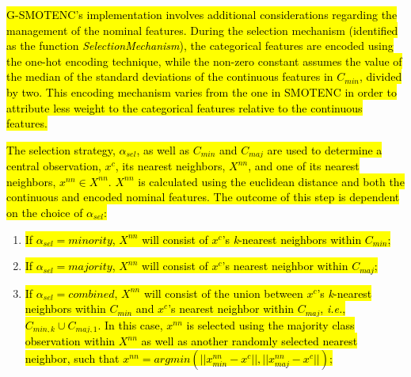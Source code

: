\documentclass[preprint,12pt]{elsarticle}
\begin{document}
{\begin{algorithm}

\end{algorithm}

\hl{G-SMOTENC's implementation involves additional considerations regarding the
management of the nominal features. During the selection mechanism (identified
as the function \textit{SelectionMechanism}), the categorical features are
encoded using the one-hot encoding technique, while the non-zero constant
assumes the value of the median of the standard deviations of the continuous
features in $C_{min}$, divided by two. This encoding mechanism varies from
the one in SMOTENC in order to attribute less weight to the categorical
features relative to the continuous features.}

\hl{The selection strategy, $\alpha_{sel}$,
as well as $C_{min}$ and $C_{maj}$ are used to determine a central
observation, $x^c$, its nearest neighbors, $X^{nn}$, and one of its nearest
neighbors, $x^{nn} \in X^{nn}$. $X^{nn}$ is calculated using the euclidean
distance and both the continuous and encoded nominal features. The outcome of
this step is dependent on the choice of $\alpha_{sel}$:}

\begin{enumerate}
    \item \hl{If $\alpha_{sel} = \mathit{minority}$, $X^{nn}$ will consist of
        $x^c$'s \textit{k}-nearest neighbors within $C_{min}$;}
    \item \hl{If $\alpha_{sel} = \mathit{majority}$, $X^{nn}$ will consist of
        $x^c$'s nearest neighbor within $C_{maj}$;} 
    \item \hl{If $\alpha_{sel} = \mathit{combined}$, $X^{nn}$ will consist of
        the union between $x^c$'s \textit{k}-nearest neighbors within
        $C_{min}$ and $x^c$'s nearest neighbor within $C_{maj}$,
        \textit{i.e.}, $C_{min,k} \cup C_{maj,1}$. In this case, $x^{nn}$ is
        selected using the majority class observation within $X^{nn}$ as well
        as another randomly selected nearest neighbor, such that $x^{nn} =
        argmin(||x^{nn}_{min}-x^c||, ||x^{nn}_{maj}-x^c||)$;}
\end{enumerate}

}
\end{document}
